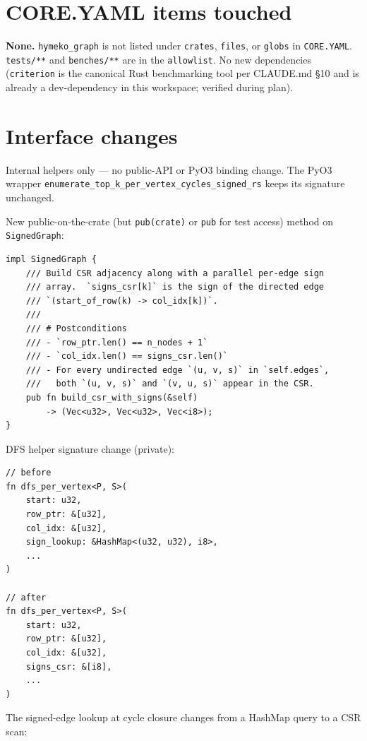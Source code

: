 \documentclass[a4paper,11pt]{article}
\begin{document}
\section*{CORE.YAML items touched}

\textbf{None.} \texttt{hymeko\_graph} is not listed under
\texttt{crates}, \texttt{files}, or \texttt{globs} in
\texttt{CORE.YAML}. \texttt{tests/**} and \texttt{benches/**} are in the
\texttt{allowlist}. No new dependencies (\texttt{criterion} is the
canonical Rust benchmarking tool per CLAUDE.md \S10 and is already a
dev-dependency in this workspace; verified during plan).

\section*{Interface changes}

Internal helpers only — no public-API or PyO3 binding change. The
PyO3 wrapper \texttt{enumerate\_top\_k\_per\_vertex\_cycles\_signed\_rs}
keeps its signature unchanged.

New public-on-the-crate (but \texttt{pub(crate)} or \texttt{pub} for
test access) method on \texttt{SignedGraph}:

\begin{lstlisting}
impl SignedGraph {
    /// Build CSR adjacency along with a parallel per-edge sign
    /// array.  `signs_csr[k]` is the sign of the directed edge
    /// `(start_of_row(k) -> col_idx[k])`.
    ///
    /// # Postconditions
    /// - `row_ptr.len() == n_nodes + 1`
    /// - `col_idx.len() == signs_csr.len()`
    /// - For every undirected edge `(u, v, s)` in `self.edges`,
    ///   both `(u, v, s)` and `(v, u, s)` appear in the CSR.
    pub fn build_csr_with_signs(&self)
        -> (Vec<u32>, Vec<u32>, Vec<i8>);
}
\end{lstlisting}

DFS helper signature change (private):

\begin{lstlisting}
// before
fn dfs_per_vertex<P, S>(
    start: u32,
    row_ptr: &[u32],
    col_idx: &[u32],
    sign_lookup: &HashMap<(u32, u32), i8>,
    ...
)

// after
fn dfs_per_vertex<P, S>(
    start: u32,
    row_ptr: &[u32],
    col_idx: &[u32],
    signs_csr: &[i8],
    ...
)
\end{lstlisting}

The signed-edge lookup at cycle closure changes from a HashMap query
to a CSR scan:
\end{document}
